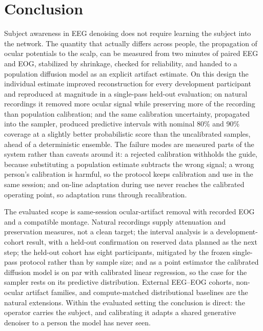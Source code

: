 \section{Conclusion}
\label{sec:conclusion}

Subject awareness in EEG denoising does not require learning the subject into the network. The quantity that actually differs across people, the propagation of ocular potentials to the scalp, can be measured from two minutes of paired EEG and EOG, stabilized by shrinkage, checked for reliability, and handed to a population diffusion model as an explicit artifact estimate. On this design the individual estimate improved reconstruction for every development participant and reproduced at magnitude in a single-pass held-out evaluation; on natural recordings it removed more ocular signal while preserving more of the recording than population calibration; and the same calibration uncertainty, propagated into the sampler, produced predictive intervals with nominal 80\% and 90\% coverage at a slightly better probabilistic score than the uncalibrated samples, ahead of a deterministic ensemble. The failure modes are measured parts of the system rather than caveats around it: a rejected calibration withholds the guide, because substituting a population estimate subtracts the wrong signal; a wrong person's calibration is harmful, so the protocol keeps calibration and use in the same session; and on-line adaptation during use never reaches the calibrated operating point, so adaptation runs through recalibration.

The evaluated scope is same-session ocular-artifact removal with recorded EOG and a compatible montage. Natural recordings supply attenuation and preservation measures, not a clean target; the interval analysis is a development-cohort result, with a held-out confirmation on reserved data planned as the next step; the held-out cohort has eight participants, mitigated by the frozen single-pass protocol rather than by sample size; and as a point estimator the calibrated diffusion model is on par with calibrated linear regression, so the case for the sampler rests on its predictive distribution. External EEG--EOG cohorts, non-ocular artifact families, and compute-matched distributional baselines are the natural extensions. Within the evaluated setting the conclusion is direct: the operator carries the subject, and calibrating it adapts a shared generative denoiser to a person the model has never seen.
